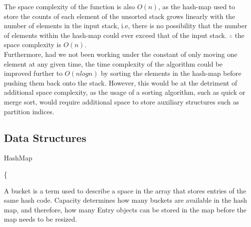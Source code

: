 \documentclass[a4paper]{article}
\begin{document}
The space complexity of the function is also $O(n)$,
as the hash-map used to store the counts of each element of the unsorted stack
grows linearly with the number of elements in the input stack,
i.e, there is no possibility that the number of elements within the hash-map could ever exceed that of the input stack.
$\therefore$ the space complexity is $O(n)$. \\

Furthermore, had we not been working under the constant of only moving one element at any given time,
the time complexity of the algorithm could be improved further
to $O(n log n)$ by sorting the elements in the hash-map before pushing them back onto the stack.
However, this would be at the detriment of additional space complexity,
as the usage of a sorting algorithm, such as quick or merge sort, 
would require additional space to store auxiliary structures such as partition indices. \\ 



\subsection{Data Structures} 
\vspace{4mm}


\makeatletter
\renewcommand{\ALG@name}{Structure}
\makeatother
\setcounter{algorithm}{0}

\begin{algorithm}
\caption{HashMap}\label{euclid}
\begin{algorithmic}[1]



\algrenewcommand{}
 {\{} \\
\EndProcedure
\end{algorithmic}
\end{algorithm}

A bucket is a term used to describe a space in the array that stores entries of the same hash code.
Capacity determines how many buckets are available in the hash map, and therefore,
how many Entry objects can be stored in the map before the map needs to be resized. \\
\end{document}
